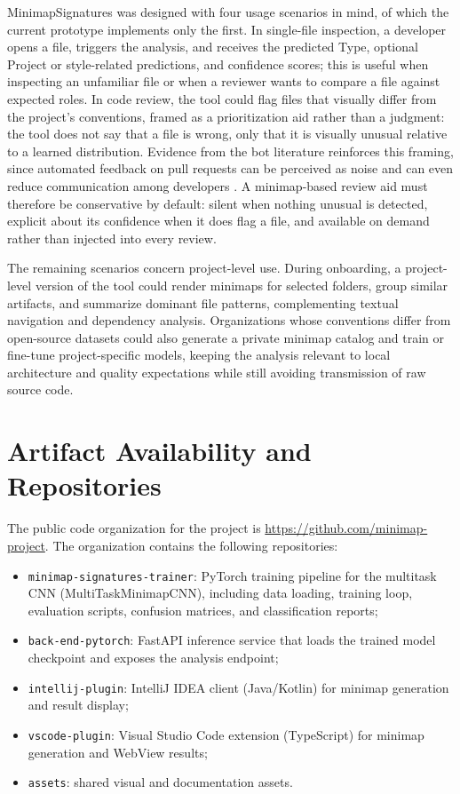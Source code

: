 MinimapSignatures was designed with four usage scenarios in mind, of which the
current prototype implements only the first. In single-file inspection, a
developer opens a file, triggers the analysis, and receives the predicted Type,
optional Project or style-related predictions, and confidence scores; this is
useful when inspecting an unfamiliar file or when a reviewer wants to compare a
file against expected roles. In code review, the tool could flag files that
visually differ from the project's conventions, framed as a prioritization aid
rather than a judgment: the tool does not say that a file is wrong, only that
it is visually unusual relative to a learned distribution. Evidence from the
bot literature reinforces this framing, since automated feedback on pull
requests can be perceived as noise and can even reduce communication among
developers \cite{wessel2021dontdisturb,wessel2022quality}. A minimap-based
review aid must therefore be conservative by default: silent when nothing
unusual is detected, explicit about its confidence when it does flag a file,
and available on demand rather than injected into every review.

The remaining scenarios concern project-level use. During onboarding, a
project-level version of the tool could render minimaps for selected folders,
group similar artifacts, and summarize dominant file patterns, complementing
textual navigation and dependency analysis. Organizations whose conventions
differ from open-source datasets could also generate a private minimap catalog
and train or fine-tune project-specific models, keeping the analysis relevant
to local architecture and quality expectations while still avoiding
transmission of raw source code.

\section{Artifact Availability and Repositories}

The public code organization for the project is
\url{https://github.com/minimap-project}. The organization contains the
following repositories:

\begin{itemize}
    \item \texttt{minimap-signatures-trainer}: PyTorch training pipeline for
    the multitask CNN (MultiTaskMinimapCNN), including data loading, training
    loop, evaluation scripts, confusion matrices, and classification reports;
    \item \texttt{back-end-pytorch}: FastAPI inference service that loads the
    trained model checkpoint and exposes the analysis endpoint;
    \item \texttt{intellij-plugin}: IntelliJ IDEA client (Java/Kotlin) for
    minimap generation and result display;
    \item \texttt{vscode-plugin}: Visual Studio Code extension (TypeScript) for
    minimap generation and WebView results;
    \item \texttt{assets}: shared visual and documentation assets.
\end{itemize}

